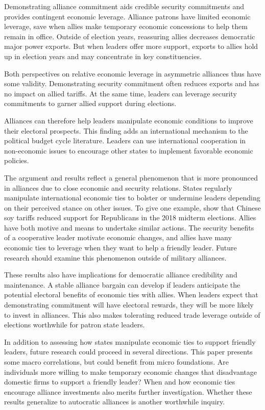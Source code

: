 \documentclass[12pt]{article}
\begin{document}
Demonstrating alliance commitment aids credible security commitments and provides contingent economic leverage. 
Alliance patrons have limited economic leverage, save when allies make temporary economic concessions to help them remain in office. 
Outside of election years, reassuring allies decreases democratic major power exports.
But when leaders offer more support, exports to allies hold up in election years and may concentrate in key constituencies.


Both perspectives on relative economic leverage in asymmetric alliances thus have some validity. 
Demonstrating security commitment often reduces exports and has no impact on allied tariffs. 
At the same time, leaders can leverage security commitments to garner allied support during elections. 


Alliances can therefore help leaders manipulate economic conditions to improve their electoral prospects. 
This finding adds an international mechanism to the political budget cycle literature.
Leaders can use international cooperation in non-economic issues to encourage other states to implement favorable economic policies. 


The argument and results reflect a general phenomenon that is more pronounced in alliances due to close economic and security relations. 
States regularly manipulate international economic ties to bolster or undermine leaders depending on their perceived stance on other issues. 
To give one example, \citet{ChyzhUrbatsch2021} show that Chinese soy tariffs reduced support for Republicans in the 2018 midterm elections. 
Allies have both motive and means to undertake similar actions. 
The security benefits of a cooperative leader motivate economic changes, and allies have many economic ties to leverage when they want to help a friendly leader. 
Future research should examine this phenomenon outside of military alliances.


These results also have implications for democratic alliance credibility and maintenance. 
A stable alliance bargain can develop if leaders anticipate the potential electoral benefits of economic ties with allies.
When leaders expect that demonstrating commitment will have electoral rewards, they will be more likely to invest in alliances. 
This also makes tolerating reduced trade leverage outside of elections worthwhile for patron state leaders.


In addition to assessing how states manipulate economic ties to support friendly leaders, future research could proceed in several directions. 
This paper presents some macro correlations, but could benefit from micro foundations. 
Are individuals more willing to make temporary economic changes that disadvantage domestic firms to support a friendly leader? 
When and how economic ties encourage alliance investments also merits further investigation.
Whether these results generalize to autocratic alliances is another worthwhile inquiry. 
\end{document}
